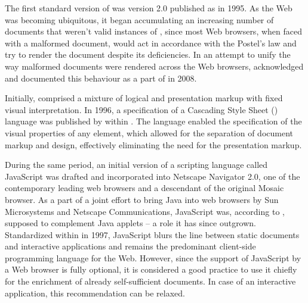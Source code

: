 \documentclass{book}
\begin{document}

        The first standard version of  was version 2.0 published
        as \cite{rfc1866} in 1995. As the Web was becoming ubiquitous, it began
        accumulating an increasing number of documents that weren't valid
        instances of , since most Web browsers, when faced with a
        malformed document, would act in accordance with the Postel's law and
        try to render the document despite its deficiencies. In an attempt to
        unify the way malformed  documents were rendered across
        the Web browsers,  acknowledged and documented this
        behaviour as a part of \cite[Section~8.2, Parsing HTML
        documents]{hickson14} in 2008.


        Initially,  comprised a mixture of logical and
        presentation markup with fixed visual interpretation. In 1996, a
        specification of a Cascading Style Sheet () language was
        published by  within \cite{lie96}. The language enabled
        the specification of the visual properties of any element, which allowed
        for the separation of document markup and design, effectively
        eliminating the need for the presentation markup.


        During the same period, an initial version of a scripting language
        called JavaScript was drafted and incorporated into Netscape Navigator
        2.0, one of the contemporary leading web browsers and a descendant of
        the original Mosaic browser. As a part of a joint effort to bring Java
        into web browsers by Sun Microsystems and Netscape Communications,
        JavaScript was, according to \cite{js-announcement}, supposed to
        complement Java applets -- a role it has since outgrown. Standardized
        within \cite{ecma1} in 1997, JavaScript blurs the line between static
        documents and interactive applications and remains the predominant
        client-side programming language for the Web.  However, since the
        support of JavaScript by a Web browser is fully optional, it is
        considered a good practice to use it chiefly for the enrichment of
        already self-sufficient  documents. In case of an
        interactive application, this recommendation can be relaxed.
\end{document}
